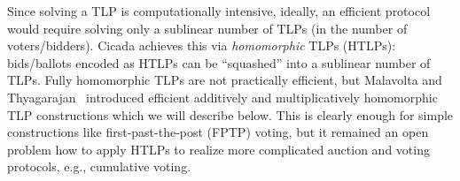 Since solving a TLP is computationally intensive, ideally, an efficient protocol would require solving only a sublinear number of TLPs (in the number of voters/bidders). Cicada achieves this via \emph{homomorphic} TLPs (HTLPs): bids/ballots encoded as HTLPs can be ``squashed'' into a sublinear number of TLPs. Fully homomorphic TLPs are not practically efficient, but Malavolta and Thyagarajan~\cite{C:MalThy19} introduced efficient additively and multiplicatively homomorphic TLP constructions which we will describe below. This is clearly enough for simple constructions like first-past-the-post (FPTP) voting, but it remained an open problem how to apply HTLPs to realize more complicated auction and voting protocols, e.g., cumulative voting.


